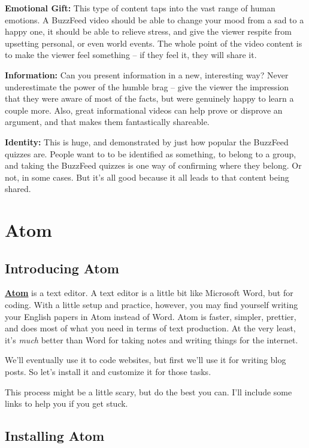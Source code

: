 \documentclass[]{book}
\theoremstyle{definition}
\theoremstyle{definition}
\theoremstyle{definition}
\theoremstyle{remark}
\begin{document}
\textbf{Emotional Gift:} This type of content taps into the vast range
of human emotions. A BuzzFeed video should be able to change your mood
from a sad to a happy one, it should be able to relieve stress, and give
the viewer respite from upsetting personal, or even world events. The
whole point of the video content is to make the viewer feel something --
if they feel it, they will share it.

\textbf{Information:} Can you present information in a new, interesting
way? Never underestimate the power of the humble brag -- give the viewer
the impression that they were aware of most of the facts, but were
genuinely happy to learn a couple more. Also, great informational videos
can help prove or disprove an argument, and that makes them
fantastically shareable.

\textbf{Identity:} This is huge, and demonstrated by just how popular
the BuzzFeed quizzes are. People want to to be identified as something,
to belong to a group, and taking the BuzzFeed quizzes is one way of
confirming where they belong. Or not, in some cases. But it's all good
because it all leads to that content being shared.

\hypertarget{atom}{%
\chapter{Atom}\label{atom}}

\hypertarget{introducing-atom}{%
\section{Introducing Atom}\label{introducing-atom}}

\textbf{\href{https://atom.io/}{Atom}} is a text editor. A text editor
is a little bit like Microsoft Word, but for coding. With a little setup
and practice, however, you may find yourself writing your English papers
in Atom instead of Word. Atom is faster, simpler, prettier, and does
most of what you need in terms of text production. At the very least,
it's \emph{much} better than Word for taking notes and writing things
for the internet.

We'll eventually use it to code websites, but first we'll use it for
writing blog posts. So let's install it and customize it for those
tasks.

This process might be a little scary, but do the best you can. I'll
include some links to help you if you get stuck.

\hypertarget{installing-atom}{%
\section{Installing Atom}\label{installing-atom}}
\end{document}
